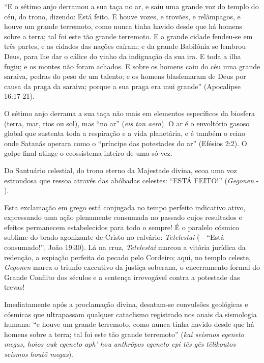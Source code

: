 ``E o sétimo anjo derramou a sua taça no ar, e saiu uma grande voz do templo do céu, do trono, dizendo: Está feito. E houve vozes, e trovões, e relâmpagos, e houve um grande terremoto, como nunca tinha havido desde que há homens sobre a terra; tal foi este tão grande terremoto. E a grande cidade fendeu-se em três partes, e as cidades das nações caíram; e da grande Babilônia se lembrou Deus, para lhe dar o cálice do vinho da indignação da sua ira. E toda a ilha fugiu; e os montes não foram achados. E sobre os homens caiu do céu uma grande saraiva, pedras do peso de um talento; e os homens blasfemaram de Deus por causa da praga da saraiva; porque a sua praga era mui grande'' (Apocalipse 16:17-21).

O sétimo anjo derrama a sua taça não mais em elementos específicos da biosfera (terra, mar, rios ou sol), mas ``no ar'' (\textit{eis ton aera}). O ar é o envoltório gasoso global que sustenta toda a respiração e a vida planetária, e é também o reino onde Satanás operara como o ``príncipe das potestades do ar'' (Efésios 2:2). O golpe final atinge o ecossistema inteiro de uma só vez.

Do Santuário celestial, do trono eterno da Majestade divina, ecoa uma voz estrondosa que ressoa através das abóbadas celestes:
``ESTÁ FEITO!'' (\textit{Gegonen} - ).

Esta exclamação em grego está conjugada no tempo perfeito indicativo ativo, expressando uma ação plenamente consumada no passado cujos resultados e efeitos permanecem estabelecidos para todo o sempre! É o paralelo cósmico sublime do brado agonizante de Cristo no calvário: \textit{Tetelestai} ( - ``Está consumado!'', João 19:30). Lá na cruz, \textit{Tetelestai} marcou a vitória jurídica da redenção, a expiação perfeita do pecado pelo Cordeiro; aqui, no templo celeste, \textit{Gegonen} marca o triunfo executivo da justiça soberana, o encerramento formal do Grande Conflito dos séculos e a sentença irrevogável contra a potestade das trevas!

Imediatamente após a proclamação divina, desatam-se convulsões geológicas e cósmicas que ultrapassam qualquer cataclismo registrado nos anais da sismologia humana:
``e houve um grande terremoto, como nunca tinha havido desde que há homens sobre a terra; tal foi este tão grande terremoto'' (\textit{kai seismos egeneto megas, hoios ouk egeneto aph' hou anthrōpos egeneto epi tēs gēs tēlikoutos seismos houtō megas}).

